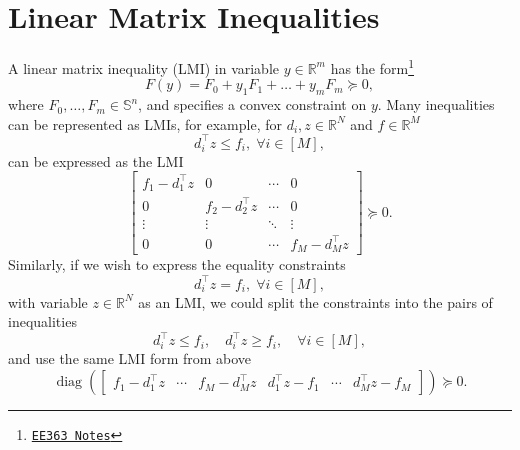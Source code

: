 \documentclass[a4paper]{article}
\DeclareMathOperator{\diag}{diag}
\begin{document}
\section*{Linear Matrix Inequalities}
A linear matrix inequality (LMI) in variable $y\in\mathbb{R}^m$ has the form\footnote{\href{https://stanford.edu/class/ee363/sessions/s4notes.pdf}{\texttt{EE363 Notes}}}
\begin{equation}
F(y) = F_0 + y_1F_1 + \dots + y_mF_m \succeq 0,
\end{equation}
where $F_0,\dots,F_m\in\mathbb{S}^n$, and specifies a convex constraint on $y$.
Many inequalities can be represented as LMIs, for example, for $d_i,z\in\mathbb{R}^N$ and $f\in\mathbb{R}^M$
\begin{equation*}
d_i^\top z \le f_i,\;\forall i\in[M],
\end{equation*}
can be expressed as the LMI
\begin{equation*}
\begin{bmatrix}
f_1 - d_1^\top z &       0          & \cdots &    0   \\
      0          & f_2 - d_2^\top z & \cdots &    0   \\
   \vdots        &     \vdots       & \ddots & \vdots \\
      0          &       0          & \cdots & f_M - d_M^\top z
\end{bmatrix} \succeq 0.
\end{equation*}
Similarly, if we wish to express the equality constraints
\begin{equation*}
d_i^\top z = f_i,\;\forall i\in[M],
\end{equation*}
with variable $z\in\mathbb{R}^N$ as an LMI, we could split the constraints into the pairs of inequalities
\begin{equation*}
d_i^\top z \le f_i, \quad d_i^\top z \ge f_i,\quad\forall i\in[M],
\end{equation*}
and use the same LMI form from above
\begin{equation*}
\diag(\begin{bmatrix}f_1-d_1^\top z & \cdots & f_M-d_M^\top z & d_1^\top z - f_1 & \cdots & d_M^\top z - f_M \end{bmatrix}) \succeq 0.
\end{equation*}
\end{document}
